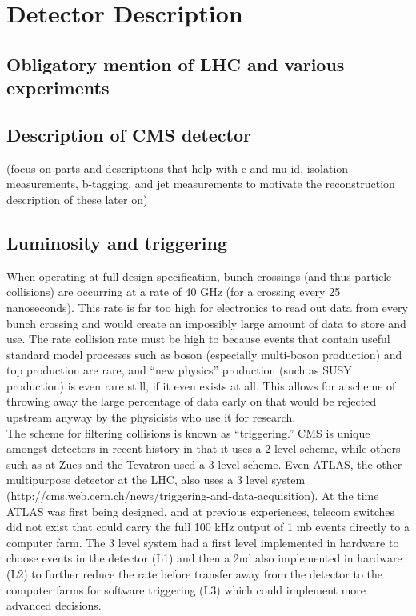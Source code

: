 \chapter{Detector Description}
	\section{Obligatory mention of LHC and various experiments}
	\section{Description of CMS detector}        
		(focus on parts and descriptions that help with e and mu id, isolation measurements, b-tagging, and jet measurements to motivate the reconstruction description of these later on)
	\section{Luminosity and triggering}       
	When operating at full design specification, bunch crossings (and thus particle collisions) are occurring at a rate of 40 GHz (for a crossing every 25 nanoseconds). This rate is far too high for electronics to read out data from every bunch crossing and would create an impossibly large amount of data to store and use. The rate collision rate must be high to because events that contain useful standard model processes such as boson (especially multi-boson production) and top production are rare, and ``new physics'' production (such as SUSY production) is even rare still, if it even exists at all. This allows for a scheme of throwing away the large percentage of data early on that would be rejected upstream anyway by the physicists who use it for research.\\
	
	The scheme for filtering collisions is known as ``triggering.'' CMS is unique amongst detectors in recent history in that it uses a 2 level scheme, while others such as at Zues and the Tevatron used a 3 level scheme. Even ATLAS, the other multipurpose detector at the LHC, also uses a 3 level system (http://cms.web.cern.ch/news/triggering-and-data-acquisition). At the time ATLAS was first being designed, and at previous experiences, telecom switches did not exist that could carry the full 100 kHz output of 1 mb events directly to a computer farm. The 3 level system had a first level implemented in hardware to choose events in the detector (L1) and then a 2nd also implemented in hardware (L2) to further reduce the rate before transfer away from the detector to the computer farms for software triggering (L3) which could implement more advanced decisions.\\
	
